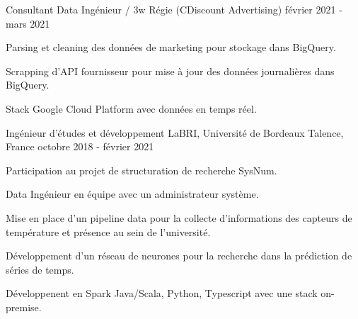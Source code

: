 \begin{cventries}
	\cventry
	{Consultant Data Ingénieur / 3w Régie (CDiscount Advertising)}{}{}
	{février 2021 - mars 2021}
	{
		\begin{cvitems}
			\item {Parsing et cleaning des données de marketing pour stockage dans BigQuery.}
			\item {Scrapping d'API fournisseur pour mise à jour des données journalières dans BigQuery.}
			\item {Stack Google Cloud Platform avec données en temps réel.}
		\end{cvitems}
	}
	
	\cventry
	{Ingénieur d'études et développement}
	{LaBRI, Université de Bordeaux}
	{Talence, France}
	{octobre 2018 - février 2021}
	{
		\begin{cvitems}
			\item {Participation au projet de structuration de recherche SysNum.}
			\item {Data Ingénieur en équipe avec un administrateur système.}
			\item {Mise en place d'un pipeline data pour la collecte d'informations des capteurs de température et présence au sein de l'université.}
			\item {Développement d'un réseau de neurones pour la recherche dans la prédiction de séries de temps.}
			\item {Développenent en Spark Java/Scala, Python, Typescript avec une stack on-premise.}
		\end{cvitems}
	}
	
\end{cventries}